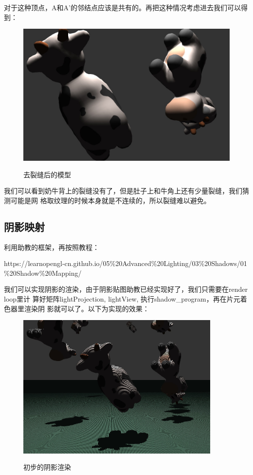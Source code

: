 \documentclass{article}
\begin{document}
	对于这种顶点，A和A’的邻结点应该是共有的。再把这种情况考虑进去我们可以得到：
	\begin{figure}[htb]
		\caption{\label{table.label} 去裂缝后的模型} \centering
		\begin{center}
			\includegraphics[width=5in]{denoise2.jpg}
			\label{figure.label}
		\end{center}
	\end{figure}

	我们可以看到奶牛背上的裂缝没有了，但是肚子上和牛角上还有少量裂缝，我们猜测可能是网
	格取纹理的时候本身就是不连续的，所以裂缝难以避免。
	\clearpage
	\subsection{阴影映射}
	利用助教的框架，再按照教程：
	
	https://learnopengl-cn.github.io/05\%20Advanced\%20Lighting/03\%20Shadows/01
	\%20Shadow\%20Mapping/
	
	我们可以实现阴影的渲染，由于阴影贴图助教已经实现好了，我们只需要在render loop里计
	算好矩阵lightProjection, lightView, 执行shadow\_program，再在片元着色器里渲染阴
	影就可以了。以下为实现的效果：
	\begin{figure}[htb]
		\caption{\label{table.label} 初步的阴影渲染} \centering
		\begin{center}
			\includegraphics[width=4in]{shadow1.jpg}
			\label{figure.label}
		\end{center}
	\end{figure}
	
\end{document}
